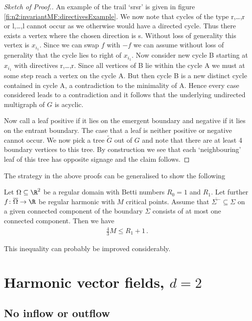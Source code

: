 \begin{proof}[Sketch of Proof.]
  An example of the trail `srsr' is given in figure \ref{fi:n2:invariantMF:directivesExample}.
  We now note that cycles of the type r,\dots,r or l,\dots,l
  cannot occur as we otherwise would have a directed cycle. Thus there exists a vertex where the chosen direction is s. 
  Without loss of generality this vertex is $x_{i_1}$.
  Since we can swap $f$ with $-f$ we can assume without loss of generality that the cycle lies to right of $x_{i_1}$.
  Now consider new cycle B starting at $x_{i_1}$ with directives r,\dots,r.
  Since all vertices of B lie within the cycle A we must at some step reach a vertex on the cycle A. But then cycle B is a new distinct cycle
  contained in cycle A, a contradiction to the minimality of A.
  Hence every case considered leads to a contradiction and it follows that the underlying undirected multigraph of $G$
  is acyclic.
  
  Now call a leaf positive if it lies on the emergent boundary and
  negative if it lies on the entrant boundary. The case that a leaf is neither positive or negative cannot occur.
  We now pick a tree $\widetilde{G}$ out of $G$ and note that
  there are at least 4 boundary vertices to this tree.
  By construction we see that each `neighbouring' leaf of this tree
  has opposite signage and the claim follows.
\end{proof} 

The strategy in the above proofs can be generalised to show the following
\begin{conjecture}
  Let $\Omega\subseteq\R^2$ be a regular domain with Betti numbers $R_0=1$ and $R_1$.
  Let further $f\colon\overline{\Omega}\to\R$ be regular harmonic with $M$ critical points.
  Assume that 
  $\overline{\Sigma^-}\subseteq\Sigma$ on a given connected component 
  of the boundary $\Sigma$
  consists of at most one connected component. Then we have
  \begin{align*}
    \frac{4}{3}M\leq R_1+1\,.
  \end{align*}
\end{conjecture}
This inequality can probably be improved considerably.

\newpage

\section{Harmonic vector fields, $d=2$}


\subsection{No inflow or outflow}

